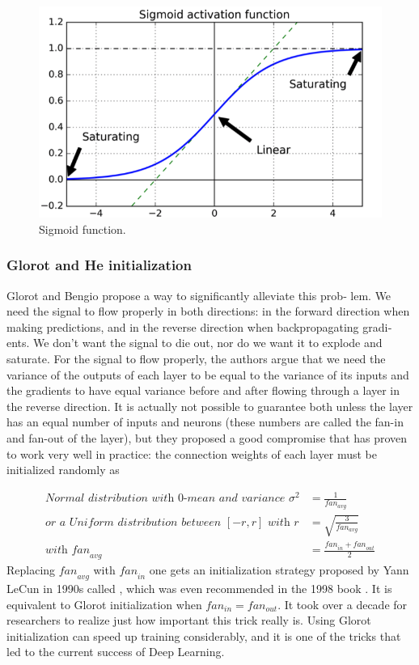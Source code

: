 \begin{figure}
\centering
\includegraphics[scale=0.4]{img/sigmoid}
\caption{Sigmoid function.}
\label{sigmoid}
\end{figure}

\subsubsection{Glorot and He initialization}
Glorot and Bengio propose a way to significantly alleviate this prob‐ lem. We need the signal to flow properly in both directions: in the forward direction when making predictions, and in the reverse direction when backpropagating gradi‐ ents. We don’t want the signal to die out, nor do we want it to explode and saturate. For the signal to flow properly, the authors argue that we need the variance of the outputs of each layer to be equal to the variance of its inputs and the gradients to have equal variance before and after flowing through a layer in the reverse direction. It is actually not possible to guarantee both unless the layer has an equal number of inputs and neurons (these numbers are called the fan-in and fan-out of the layer), but they proposed a good compromise that has proven to work very well in practice: the connection weights of each layer must be initialized randomly as

\begin{equation}
\begin{aligned}
\textit{Normal distribution with $0$-mean and variance } \sigma^2 &= \frac{1}{fan_{avg}}\\
\textit{or a Uniform distribution between $[-r, r]$ with } r &= \sqrt{\frac{3}{fan_{avg}}}\\
\textit{with} \textit{ fan}_{avg} &=\frac{\textit{fan}_{in} + \textit{fan}_{out}}{2}
\end{aligned}
\end{equation}
Replacing $\textit{fan}_{avg}$ with $\textit{fan}_{in}$ one gets an initialization strategy proposed by Yann LeCun in 1990s called , which was even recommended in the 1998 book . It is equivalent to Glorot initialization when $fan_{in} = fan_{out}$. It took over a decade for researchers to realize just how important this trick really is. Using Glorot initialization can speed up training considerably, and it is one of the tricks that led to the current success of Deep Learning.

